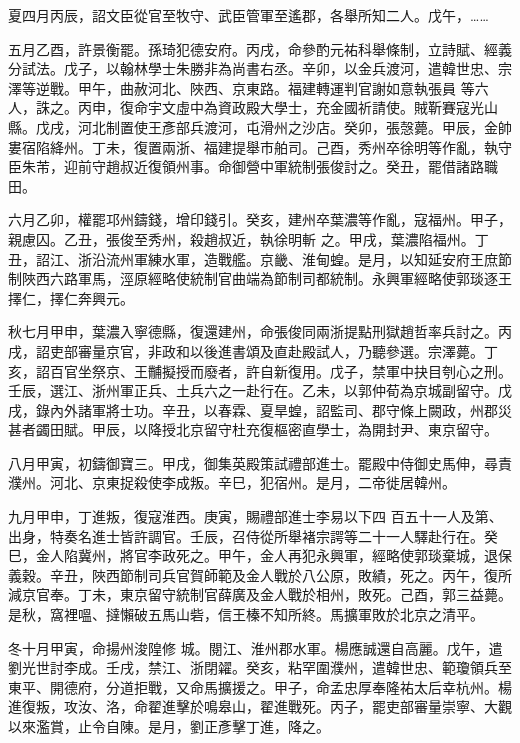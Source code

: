 \begin{pinyinscope}
 夏四月丙辰，詔文臣從官至牧守、武臣管軍至遙郡，各舉所知二人。戊午，……



 五月乙酉，許景衡罷。孫琦犯德安府。丙戌，命參酌元祐科舉條制，立詩賦、經義分試法。戊子，以翰林學士朱勝非為尚書右丞。辛卯，以金兵渡河，遣韓世忠、宗澤等逆戰。甲午，曲赦河北、陜西、京東路。福建轉運判官謝如意執張員
 等六人，誅之。丙申，復命宇文虛中為資政殿大學士，充金國祈請使。賊靳賽寇光山縣。戊戌，河北制置使王彥部兵渡河，屯滑州之沙店。癸卯，張愨薨。甲辰，金帥婁宿陷絳州。丁未，復置兩浙、福建提舉市舶司。己酉，秀州卒徐明等作亂，執守臣朱芾，迎前守趙叔近復領州事。命御營中軍統制張俊討之。癸丑，罷借諸路職田。



 六月乙卯，權罷邛州鑄錢，增印錢引。癸亥，建州卒葉濃等作亂，寇福州。甲子，親慮囚。乙丑，張俊至秀州，殺趙叔近，執徐明斬
 之。甲戌，葉濃陷福州。丁丑，詔江、浙沿流州軍練水軍，造戰艦。京畿、淮甸蝗。是月，以知延安府王庶節制陜西六路軍馬，涇原經略使統制官曲端為節制司都統制。永興軍經略使郭琰逐王擇仁，擇仁奔興元。



 秋七月甲申，葉濃入寧德縣，復還建州，命張俊同兩浙提點刑獄趙哲率兵討之。丙戌，詔吏部審量京官，非政和以後進書頌及直赴殿試人，乃聽參選。宗澤薨。丁亥，詔百官坐祭京、王黼擬授而廢者，許自新復用。戊子，禁軍中抉目刳心之刑。
 壬辰，選江、浙州軍正兵、土兵六之一赴行在。乙未，以郭仲荀為京城副留守。戊戌，錄內外諸軍將士功。辛丑，以春霖、夏旱蝗，詔監司、郡守條上闕政，州郡災甚者蠲田賦。甲辰，以降授北京留守杜充復樞密直學士，為開封尹、東京留守。



 八月甲寅，初鑄御寶三。甲戌，御集英殿策試禮部進士。罷殿中侍御史馬伸，尋責濮州。河北、京東捉殺使李成叛。辛巳，犯宿州。是月，二帝徙居韓州。



 九月甲申，丁進叛，復寇淮西。庚寅，賜禮部進士李易以下四
 百五十一人及第、出身，特奏名進士皆許調官。壬辰，召侍從所舉褚宗諤等二十一人驛赴行在。癸巳，金人陷冀州，將官李政死之。甲午，金人再犯永興軍，經略使郭琰棄城，退保義穀。辛丑，陜西節制司兵官賀師範及金人戰於八公原，敗績，死之。丙午，復所減京官奉。丁未，東京留守統制官薛廣及金人戰於相州，敗死。己酉，郭三益薨。是秋，窩裡嗢、撻懶破五馬山砦，信王榛不知所終。馬擴軍敗於北京之清平。



 冬十月甲寅，命揚州浚隍修
 城。閱江、淮州郡水軍。楊應誠還自高麗。戊午，遣劉光世討李成。壬戌，禁江、浙閉糴。癸亥，粘罕圍濮州，遣韓世忠、範瓊領兵至東平、開德府，分道拒戰，又命馬擴援之。甲子，命孟忠厚奉隆祐太后幸杭州。楊進復叛，攻汝、洛，命翟進擊於鳴皋山，翟進戰死。丙子，罷吏部審量崇寧、大觀以來濫賞，止令自陳。是月，劉正彥擊丁進，降之。




\end{pinyinscope}
